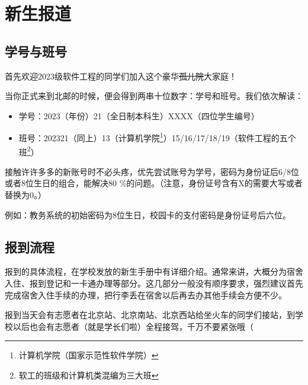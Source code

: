 \section{新生报道}

\subsection{学号与班号}

首先欢迎2023级软件工程的同学们加入这个豪华\sout{孤儿院}大家庭！

当你正式来到北邮的时候，便会得到两串十位数字：学号和班号。我们依次解读：
\begin{itemize}
    \itshape
    \item 学号：2023（年份）21（全日制本科生）XXXX（四位学生编号）
    \item 班号：202321（同上）13（计算机学院\footnote{计算机学院（国家示范性软件学院）}）15/16/17/18/19（软件工程的五个班\footnote{软工的班级和计算机类混编为三大班}）
\end{itemize}

接触许许多多的新账号时不必头疼，优先尝试账号为学号，密码为身份证后6/8位或者8位生日的组合，能解决80 \%的问题。（注意，身份证号含有X的需要大写或者替换为0。）

例如：教务系统的初始密码为8位生日，校园卡的支付密码是身份证号后六位。

\subsection{报到流程}

报到的具体流程，在学校发放的新生手册中有详细介绍。通常来讲，大概分为宿舍入住、报到登记和一卡通办理等部分。这几部分一般没有顺序要求，强烈建议首先完成宿舍入住手续的办理，把行李丢在宿舍以后再去办其他手续会方便不少。

报到当天会有志愿者在北京站、北京南站、北京西站给坐火车的同学们接站，到学校以后也会有志愿者（就是学长们啦）全程接驾，千万不要紧张哦（
